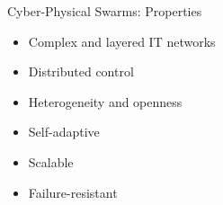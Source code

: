 \begin{frame}{Cyber-Physical Swarms: Properties}
  \begin{cardTiny}
    \begin{itemize}
      \item Complex and layered IT networks
      \item Distributed control
      \item Heterogeneity and openness
    \end{itemize}
  \end{cardTiny}
  \begin{card}
    \begin{itemize}
      \item[\success{\faThumbsUp}] Self-adaptive
      \item[\success{\faThumbsUp}] Scalable
      \item[\success{\faThumbsUp}] Failure-resistant
    \end{itemize}
  \end{card}
\end{frame}